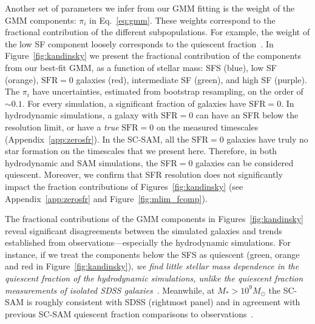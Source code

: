 \documentclass[tighten, preprint]{aastex62}
\begin{document}
Another set of parameters we infer from our GMM fitting is the weight of the 
GMM components: $\pi_i$ in Eq.~\ref{eq:gmm}. These weights correspond to 
the fractional contribution of the different subpopulations. For example, the 
weight of the low SF component loosely corresponds to the quiescent 
fraction~\citep[\emph{e.g.}][]{borch2006, bundy2006, iovino2010, geha2012, hahn2015}. 
{\color{red} In Figure~\ref{fig:kandinsky} we present the fractional contribution of the 
components from our best-fit GMM, as a function of stellar mass: SFS 
(blue), low SF (orange), $\mathrm{SFR}{=}0$ galaxies (red), intermediate SF 
(green), and high SF (purple). 
The $\pi_i$ have uncertainties, estimated from bootstrap resampling, on the
order of ${\sim}0.1$.
}
For every simulation, a significant fraction of galaxies have SFR${=}0$. 
In hydrodynamic simulations, a galaxy with $\mathrm{SFR}{=}0$ can have an 
SFR below the resolution limit, or have a \emph{true} $\mathrm{SFR}{=}0$ on 
the measured timescales (Appendix~\ref{app:zerosfr}). In the SC-SAM, all 
the $\mathrm{SFR}{=}0$ galaxies have truly no star formation on the 
timescales that we present here. Therefore, in both hydrodynamic 
and SAM simulations, the SFR${=}0$ galaxies can be considered quiescent. 
Moreover, we confirm that SFR resolution does not significantly impact the 
fraction contributions of Figures~\ref{fig:kandinsky} 
(see Appendix~\ref{app:zerosfr} and Figure~\ref{fig:mlim_fcomp}).%

The fractional contributions of the GMM components in Figures~\ref{fig:kandinsky} %
reveal significant disagreements between the 
simulated galaxies and trends established from observations---especially the 
hydrodynamic simulations. 
{\color{red}
For instance, if we treat the components below the SFS as quiescent %
(green, orange and red in Figure~\ref{fig:kandinsky}),}
\emph{we find little stellar mass dependence in the quiescent fraction of the 
hydrodynamic simulations, unlike the quiescent fraction measurements 
of isolated SDSS galaxies}~\citep{baldry2006,peng2010,hahn2015}. 
Meanwhile, at $M_*{>}10^9M_\odot$ the SC-SAM is roughly consistent with 
SDSS (rightmost panel) and in agreement with previous 
SC-SAM quiescent fraction comparisons to observations~\citep{brennan2015,brennan2017,pandya2017}.
\end{document}
